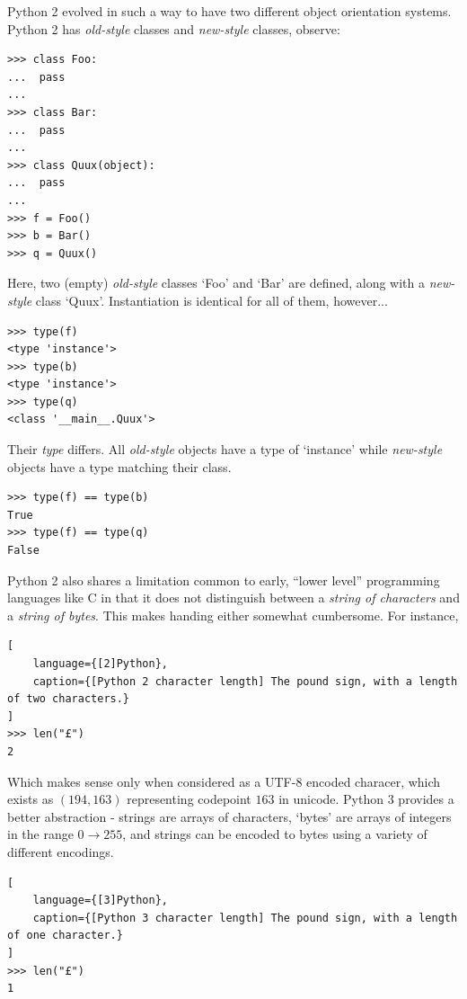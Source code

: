 \documentclass[10pt,a4paper,notitlepage]{report}
\begin{document}
Python 2 evolved in such a way to have two different object orientation systems. Python 2 has \emph{old-style} classes and \emph{new-style} classes, observe:

\begin{lstlisting}[language={[2]Python}]
>>> class Foo:
...  pass
... 
>>> class Bar:
...  pass
... 
>>> class Quux(object):
...  pass
... 
>>> f = Foo()
>>> b = Bar()
>>> q = Quux()
\end{lstlisting}

Here, two (empty) \emph{old-style} classes `Foo' and `Bar' are defined, along with a \emph{new-style} class `Quux'. Instantiation is identical for all of them, however...

\begin{lstlisting}[language={[2]Python}]
>>> type(f)
<type 'instance'>
>>> type(b)
<type 'instance'>
>>> type(q)
<class '__main__.Quux'>
\end{lstlisting}

Their \emph{type} differs. All \emph{old-style} objects have a type of `instance' while \emph{new-style} objects have a type matching their class.

\begin{lstlisting}[language={[2]Python}]
>>> type(f) == type(b)
True
>>> type(f) == type(q)
False
\end{lstlisting}

Python 2 also shares a limitation common to early, ``lower level'' programming languages like C in that it does not distinguish between a \emph{string of characters} and a \emph{string of bytes}.
This makes handing either somewhat cumbersome. For instance,

\begin{lstlisting}[
    language={[2]Python},
    caption={[Python 2 character length] The pound sign, with a length of two characters.}
]
>>> len("£")
2
\end{lstlisting}

Which makes sense only when considered as a UTF-8 encoded characer, which exists as $(194, 163)$ representing codepoint $163$ in unicode.
Python 3 provides a better abstraction - strings are arrays of characters, `bytes' are arrays of integers in the range $0 \rightarrow 255$, and strings can be encoded to bytes using a variety of different encodings.

\begin{lstlisting}[
    language={[3]Python},
    caption={[Python 3 character length] The pound sign, with a length of one character.}
]
>>> len("£")
1
\end{lstlisting}
\end{document}
